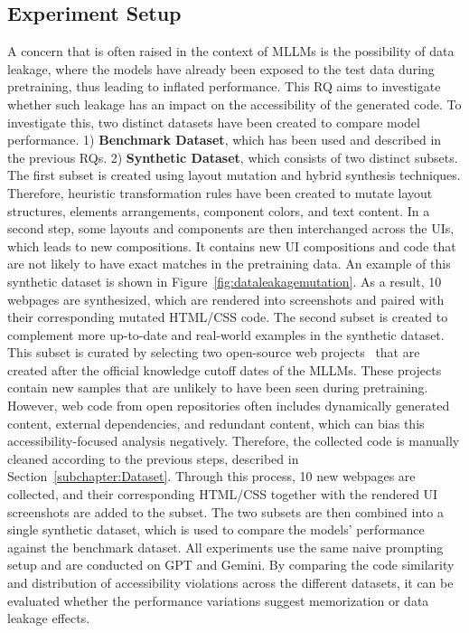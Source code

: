 \subsection{Experiment Setup}
A concern that is often raised in the context of MLLMs is 
the possibility of data leakage, where the models have 
already been exposed to the test data during pretraining, 
thus leading to inflated performance. This RQ aims to 
investigate whether such leakage has an impact on the 
accessibility of the generated code.\newline
To investigate this, two distinct datasets have been created 
to compare model performance. 1) \textbf{Benchmark Dataset},
which has been used and described in the previous RQs. 2)
\textbf{Synthetic Dataset}, which consists of two distinct 
subsets. The first subset is
created using layout mutation and
hybrid synthesis techniques. Therefore,
heuristic transformation rules have been created to
mutate layout structures, elements arrangements,
component colors, and text content. In a second step,
some layouts and components are then interchanged across 
the UIs, which leads to new compositions. 
It contains new
UI compositions and code that are not likely to have
exact matches in the pretraining data.
An example 
of this synthetic dataset is shown in Figure~\ref{fig:dataleakagemutation}.
As a result, 10 webpages are synthesized, which are 
rendered into screenshots and paired with their 
corresponding mutated HTML/CSS code. 
The second subset is created to complement 
more up-to-date and real-world examples in the synthetic 
dataset. This subset is curated by selecting two 
open-source web projects~\cite{web:ecommerceferhan, web:alphaonelabsedu}
that are created after the official knowledge cutoff 
dates of the MLLMs. These projects contain new samples 
that are unlikely to have been seen during pretraining.
However, web code from open repositories often 
includes dynamically generated content, external dependencies, 
and redundant content, which can bias this accessibility-focused 
analysis negatively. Therefore, the collected code 
is manually cleaned according to the previous 
steps, described in Section~\ref{subchapter:Dataset}.
Through this process, 10 new webpages are collected, and
their corresponding HTML/CSS together with the rendered UI screenshots 
are added to the subset.\newline
The two subsets are then combined into a single 
synthetic dataset, which is used to compare the 
models' performance against the benchmark dataset.\newline
All experiments use the same naive prompting setup 
and are conducted on GPT and Gemini.
By comparing the code similarity and distribution of 
accessibility violations across the 
different datasets, it can be evaluated 
whether the performance variations suggest
memorization or data leakage effects.

